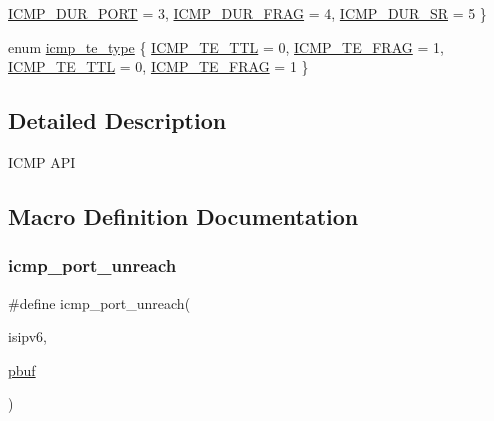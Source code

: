 \begin{DoxyCompactItemize}
\hyperlink{openmote-cc2538_2lwip_2src_2include_2lwip_2icmp_8h_a17637465f209385e5d19ef47fd9266a5ac973dd9b04e094043ccc4cf875ef5644}{I\+C\+M\+P\+\_\+\+D\+U\+R\+\_\+\+P\+O\+RT} = 3, 
\hyperlink{openmote-cc2538_2lwip_2src_2include_2lwip_2icmp_8h_a17637465f209385e5d19ef47fd9266a5a8be2bc49d42aa1a6ee1da93a8700ef5f}{I\+C\+M\+P\+\_\+\+D\+U\+R\+\_\+\+F\+R\+AG} = 4, 
\hyperlink{openmote-cc2538_2lwip_2src_2include_2lwip_2icmp_8h_a17637465f209385e5d19ef47fd9266a5af63296fc25f79e56946a56a8da132c13}{I\+C\+M\+P\+\_\+\+D\+U\+R\+\_\+\+SR} = 5
 \}
\item 
enum \hyperlink{openmote-cc2538_2lwip_2src_2include_2lwip_2icmp_8h_a058d0a0769bd38db99fc6fd1dad1324a}{icmp\+\_\+te\+\_\+type} \{ \hyperlink{native_2lwip_2src_2include_2lwip_2icmp_8h_a058d0a0769bd38db99fc6fd1dad1324aa827a1f8705826a6cc3c22e2571acf02c}{I\+C\+M\+P\+\_\+\+T\+E\+\_\+\+T\+TL} = 0, 
\hyperlink{native_2lwip_2src_2include_2lwip_2icmp_8h_a058d0a0769bd38db99fc6fd1dad1324aa4d351874c3e2d4a4cf46569df28cd796}{I\+C\+M\+P\+\_\+\+T\+E\+\_\+\+F\+R\+AG} = 1, 
\hyperlink{openmote-cc2538_2lwip_2src_2include_2lwip_2icmp_8h_a058d0a0769bd38db99fc6fd1dad1324aa827a1f8705826a6cc3c22e2571acf02c}{I\+C\+M\+P\+\_\+\+T\+E\+\_\+\+T\+TL} = 0, 
\hyperlink{openmote-cc2538_2lwip_2src_2include_2lwip_2icmp_8h_a058d0a0769bd38db99fc6fd1dad1324aa4d351874c3e2d4a4cf46569df28cd796}{I\+C\+M\+P\+\_\+\+T\+E\+\_\+\+F\+R\+AG} = 1
 \}
\end{DoxyCompactItemize}


\subsection{Detailed Description}
I\+C\+MP A\+PI 

\subsection{Macro Definition Documentation}
\mbox{\label{openmote-cc2538_2lwip_2src_2include_2lwip_2icmp_8h_a8d52f47a3b8237697544280c22f2925e}} 
\subsubsection{\texorpdfstring{icmp\+\_\+port\+\_\+unreach}{icmp\_port\_unreach}}
{\footnotesize\ttfamily \#define icmp\+\_\+port\+\_\+unreach(\begin{DoxyParamCaption}\item[{}]{isipv6,  }\item[{}]{\hyperlink{structpbuf}{pbuf} }\end{DoxyParamCaption})}



